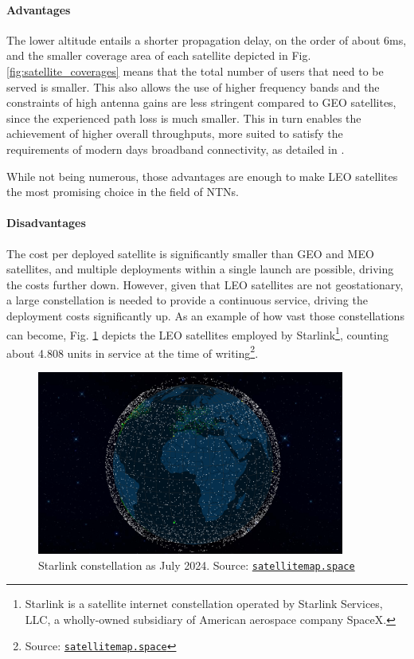 \paragraph{Advantages}
The lower altitude entails a shorter propagation delay, on the order of about 6ms, and the smaller coverage area of each satellite depicted in Fig. \ref{fig:satellite_coverages} means that the total number of users that need to be served is smaller. This also allows the use of higher frequency bands and the constraints of high antenna gains are less stringent compared to \ac{GEO} satellites, since the experienced path loss is much smaller. This in turn enables the achievement of higher overall throughputs, more suited to satisfy the requirements of modern days broadband connectivity, as detailed in \cite{satellite-communication-mmwave-giordani}.

While not being numerous, those advantages are enough to make \ac{LEO} satellites the most promising choice in the field of \ac{NTN}s.

\paragraph{Disadvantages}
The cost per deployed satellite is significantly smaller than \ac{GEO} and \ac{MEO} satellites, and multiple deployments within a single launch are possible, driving the costs further down. However, given that \ac{LEO} satellites are not geostationary, a large constellation is needed to provide a continuous service, driving the deployment costs significantly up. As an example of how vast those constellations can become, Fig. \ref{fig:starlink_constellation} depicts the \ac{LEO} satellites employed by Starlink\footnote{Starlink is a satellite internet constellation operated by Starlink Services, LLC, a wholly-owned subsidiary of American aerospace company SpaceX.}, counting about 4.808 units in service at the time of writing\footnote{Source: \href{https://satellitemap.space/}{\texttt{satellitemap.space}}}.

\begin{figure}[ht]
    \centering
    \includegraphics[width=0.9\textwidth]{res/starlink-constellation.png}
    \caption{Starlink constellation as July 2024. Source: \href{https://satellitemap.space/}{\texttt{satellitemap.space}}}
    \label{fig:starlink_constellation}
\end{figure}

